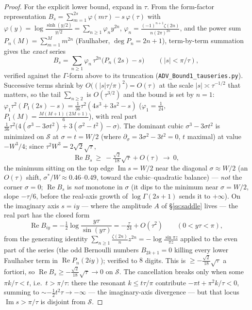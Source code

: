 \begin{proof}
For the explicit lower bound, expand in $\tau$. From the form-factor representation
$B_s=\sum_{m=1}^{2s}\varphi(m\tau)-s\,\varphi(\tau)$ with
$\varphi(y)=\log\frac{\sinh(y/2)}{y/2}=\sum_{n\ge1}\varphi_n y^{2n}$,
$\varphi_n=\frac{(-1)^{n+1}\zeta(2n)}{n(2\pi)^{2n}}$, and the power sum $P_n(M)=\sum_{m=1}^M m^{2n}$
\textup(Faulhaber, $\deg P_n=2n{+}1$\textup), term-by-term summation gives the \emph{exact} series
\[
   B_s=\sum_{n\ge1}\varphi_n\,\tau^{2n}\bigl(P_n(2s)-s\bigr)\qquad(|s|<\pi/\tau),
\]
verified against the $\Gamma$-form above to its truncation (\texttt{ADV\_Bound1\_tauseries.py}). Successive
terms shrink by $O\bigl((|s|\tau/\pi)^2\bigr)=O(\tau)$ at the scale $|s|\asymp\tau^{-1/2}$ that matters, so the
tail $\sum_{n\ge2}$ is $O(\tau^{3/2})$ and the bound is set by $n=1$:
$\varphi_1\tau^2(P_1(2s)-s)=\tfrac1{36}\tau^2(4s^3+3s^2-s)$
\textup($\varphi_1=\tfrac1{24}$, $P_1(M)=\tfrac{M(M{+}1)(2M{+}1)}6$\textup), with real part
$\tfrac1{36}\tau^2\bigl(4(\sigma^3{-}3\sigma t^2)+3(\sigma^2{-}t^2)-\sigma\bigr)$. The dominant cubic
$\sigma^3-3\sigma t^2$ is minimized on $\mathcal S$ at $\sigma=t=W/2$ (where $\partial_\sigma=3\sigma^2-3t^2=0$,
$t$ maximal) at value $-W^3/4$; since $\tau^2W^3=2\sqrt2\sqrt\tau$,
\[
   \operatorname{Re}B_s\ \ge\ -\tfrac{\sqrt2}{18}\sqrt\tau+O(\tau)\ \longrightarrow\ 0,
\]
the minimum sitting on the top edge $\operatorname{Im}s=W/2$ near the diagonal $\sigma\approx W/2$ \textup(an
$O(\tau)$ shift, $\sigma^\ast/W\approx0.46$--$0.49$, toward the cubic--quadratic balance\textup) --- \emph{not}
the corner $\sigma=0$; $\operatorname{Re}B_s$ is
\emph{not} monotone in $\sigma$ (it dips to the minimum near $\sigma=W/2$, slope $-\tau/6$, before the real-axis
growth of $\log\Gamma(2s{+}1)$ sends it to $+\infty$). On the imaginary axis $s=iy$ --- where the amplitude $A$
of \S\ref{ss:saddle} lives --- the real part has the closed form
\[
   \operatorname{Re}B_{iy}=-\tfrac12\log\frac{y\tau}{\sin(y\tau)}=-\tfrac\tau{24}+O(\tau^2)\qquad(0<y\tau<\pi),
\]
from the generating identity $\sum_{n\ge1}\tfrac{\zeta(2n)}n z^{2n}=-\log\tfrac{\sin\pi z}{\pi z}$ applied to
the even part of the series (the odd Bernoulli numbers $B_{2k+1}=0$ killing every lower Faulhaber term in
$\operatorname{Re}P_n(2iy)$); verified to $8$ digits. This is $\ge-\tfrac{\sqrt2}{18}\sqrt\tau$ a fortiori, so
$\operatorname{Re}B_s\ge-\tfrac{\sqrt2}{18}\sqrt\tau\to0$ on $\mathcal S$. The cancellation breaks
only when some $\pi k/\tau<t$, i.e.\ $t>\pi/\tau$: there the resonant $k\le t\tau/\pi$ contribute
$-\pi t+\pi^2k/\tau<0$, summing to $\sim-\tfrac12t^2\tau\to-\infty$ — the imaginary-axis divergence — but
that locus $\operatorname{Im}s>\pi/\tau$ is disjoint from $\mathcal S$.
\end{proof}

